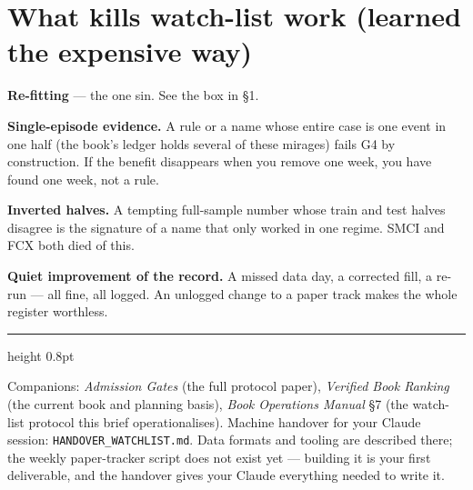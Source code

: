 \documentclass[11pt,a4paper]{article}
\begin{document}
\section{What kills watch-list work (learned the expensive way)}

\begin{checklist}
\item \textbf{Re-fitting} --- the one sin. See the box in \S1.
\item \textbf{Single-episode evidence.} A rule or a name whose entire case is
      one event in one half (the book's ledger holds several of these
      mirages) fails G4 by construction. If the benefit disappears when you
      remove one week, you have found one week, not a rule.
\item \textbf{Inverted halves.} A tempting full-sample number whose train and
      test halves disagree is the signature of a name that only worked in one
      regime. SMCI and FCX both died of this.
\item \textbf{Quiet improvement of the record.} A missed data day, a
      corrected fill, a re-run --- all fine, all logged. An unlogged change
      to a paper track makes the whole register worthless.
\end{checklist}

\vspace{0.4cm}
{\color{bcnavy}\hrule height 0.8pt}
\vspace{0.2cm}
{\footnotesize\color{bcgrey} Companions: \emph{Admission Gates} (the full
protocol paper), \emph{Verified Book Ranking} (the current book and planning
basis), \emph{Book Operations Manual} \S7 (the watch-list protocol this brief
operationalises). Machine handover for your Claude session:
\texttt{HANDOVER\_WATCHLIST.md}. Data formats and tooling are described
there; the weekly paper-tracker script does not exist yet --- building it is
your first deliverable, and the handover gives your Claude everything needed
to write it.}
\end{document}
